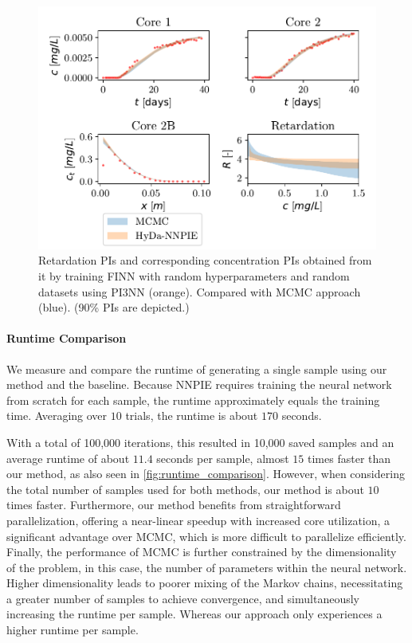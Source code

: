 \begin{figure}[h!]
    \centering
    \includegraphics{figs/finn_MCMCvsFull-SPAN_PIs.pdf}
    \caption{Retardation PIs and corresponding concentration PIs obtained from it by training FINN with random hyperparameters and random datasets using PI3NN (orange). Compared with MCMC approach (blue). (90\% PIs are depicted.)}
    \label{fig:mcmc_vs_fullspan}
\end{figure}




\paragraph{Runtime Comparison}
We measure and compare the runtime of generating a single sample using our method and the baseline. Because NNPIE requires training the neural network from scratch for each sample, the runtime approximately equals the training time. Averaging over $10$ trials, the runtime is about $170$ seconds.

With a total of 100,000 iterations, this resulted in 10,000 saved samples and an average runtime of about $11.4$ seconds per sample, almost $15$ times faster than our method, as also seen in \cref{fig:runtime_comparison}. However, when considering the total number of samples used for both methods, our method is about $10$ times faster. Furthermore, our method benefits from straightforward parallelization, offering a near-linear speedup with increased core utilization, a significant advantage over MCMC, which is more difficult to parallelize efficiently.
Finally, the performance of MCMC is further constrained by the dimensionality of the problem, in this case, the number of parameters within the neural network. Higher dimensionality leads to poorer mixing of the Markov chains, necessitating a greater number of samples to achieve convergence, and simultaneously increasing the runtime per sample. Whereas our approach only experiences a higher runtime per sample.


